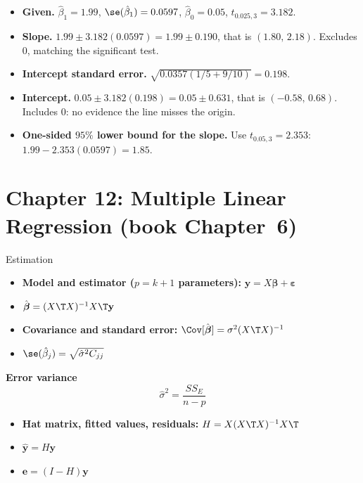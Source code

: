 \begin{example}
\begin{itemize}
  \item \textbf{Given.} $\hat\beta_1=1.99$, $\se(\hat\beta_1)=0.0597$, $\hat\beta_0=0.05$, $t_{0.025,3}=3.182$.
  \item \textbf{Slope.} $1.99\pm3.182(0.0597)=1.99\pm0.190$, that is $(1.80,\,2.18)$. Excludes $0$, matching the significant test.
  \item \textbf{Intercept standard error.} $\sqrt{0.0357(1/5+9/10)}=0.198$.
  \item \textbf{Intercept.} $0.05\pm3.182(0.198)=0.05\pm0.631$, that is $(-0.58,\,0.68)$. Includes $0$: no evidence the line misses the origin.
  \item \textbf{One-sided $95\%$ lower bound for the slope.} Use $t_{0.05,3}=2.353$: $1.99-2.353(0.0597)=1.85$.
\end{itemize}
\end{example}

\section{Chapter 12: Multiple Linear Regression (book Chapter~6)}

\begin{formulabox}{Estimation}
\begin{itemize}
  \item \textbf{Model and estimator ($p=k+1$ parameters):} $\mathbf{y}=X\boldsymbol\beta+\boldsymbol\varepsilon$
  \item $\hat{\boldsymbol\beta}=(X\T X)^{-1}X\T\mathbf{y}$
  \item \textbf{Covariance and standard error:} $\Cov[\hat{\boldsymbol\beta}]=\sigma^2(X\T X)^{-1}$
  \item $\se(\hat\beta_j)=\sqrt{\hat\sigma^2C_{jj}}$
\end{itemize}
\textbf{Error variance}
\[ \hat\sigma^2=\frac{SS_E}{n-p} \]
\begin{itemize}
  \item \textbf{Hat matrix, fitted values, residuals:} $H=X(X\T X)^{-1}X\T$
  \item $\hat{\mathbf{y}}=H\mathbf{y}$
  \item $\mathbf{e}=(I-H)\mathbf{y}$
\end{itemize}
\end{formulabox}

